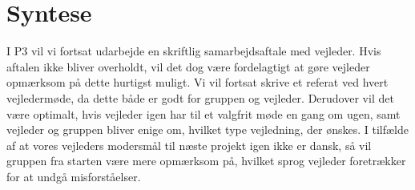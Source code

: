 	\section{Syntese}
	I P$3$ vil vi fortsat udarbejde en skriftlig samarbejdsaftale med vejleder. Hvis aftalen ikke bliver overholdt, vil det dog være fordelagtigt at gøre vejleder opmærksom på dette hurtigst muligt. Vi vil fortsat skrive et referat ved hvert vejledermøde, da dette både er godt for gruppen og vejleder. Derudover vil det være optimalt, hvis vejleder igen har til et valgfrit møde en gang om ugen, samt vejleder og gruppen bliver enige om, hvilket type vejledning, der ønskes. I tilfælde af at vores vejleders modersmål til næste projekt igen ikke er dansk, så vil gruppen fra starten være mere opmærksom på, hvilket sprog vejleder foretrækker for at undgå misforståelser.